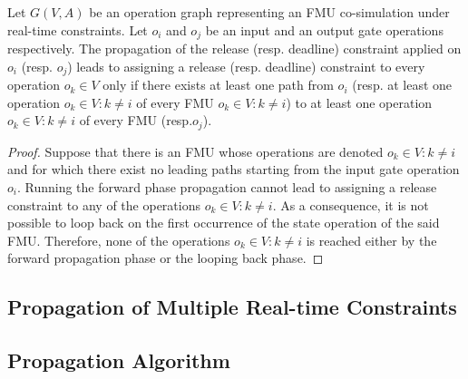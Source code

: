 \begin{lemma}
Let $G(V,A)$ be an operation graph representing an FMU co-simulation under real-time constraints. Let $o_i$ and $o_j$ be an input and an output gate operations respectively. The propagation of the release (resp. deadline) constraint applied on $o_i$ (resp. $o_j$) leads to assigning a release (resp. deadline) constraint to every operation $o_k \in V$ only if there exists at least one path from $o_i$ (resp. at least one operation $o_k \in  V : k \neq i$ of every FMU $o_k \in  V : k \neq i$) to at least one operation $o_k \in  V : k \neq i$ of every FMU (resp.$o_j$).  
\label{lem:coverage}
\end{lemma}

\begin{proof}
Suppose that there is an FMU whose operations are denoted $o_k \in  V : k \neq i$ and for which there exist no leading paths starting from the input gate operation $o_i$. Running the forward phase propagation cannot lead to assigning a release constraint to any of the operations $o_k \in  V : k \neq i$. As a consequence, it is not possible to loop back on the first occurrence of the state operation of the said FMU. Therefore, none of the operations $o_k \in  V : k \neq i$ is reached either by the forward propagation phase or the looping back phase.      
\end{proof}

\subsection{Propagation of Multiple Real-time Constraints}

\subsection{Propagation Algorithm}


